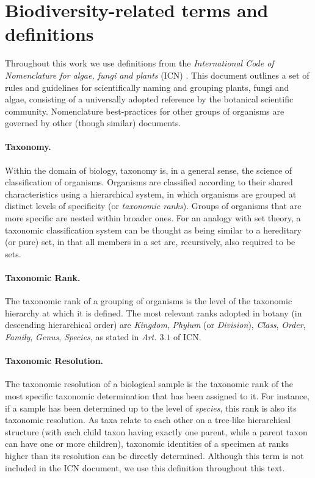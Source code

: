 \section{Biodiversity-related terms and definitions} \label{section:biodiversity_terms}

Throughout this work we use definitions from the \textit{International Code of Nomenclature for algae, fungi and plants} (ICN) \cite{McNeill2012}. This document outlines a set of rules and guidelines for scientifically naming and grouping plants, fungi and algae, consisting of a universally adopted reference by the botanical scientific community. Nomenclature best-practices for other groups of organisms are governed by other (though similar) documents.

\paragraph*{Taxonomy.}
Within the domain of biology, taxonomy is, in a general sense, the science of classification of organisms. 
Organisms are classified according to their shared characteristics using a hierarchical system, in which organisms are grouped at distinct levels of specificity (or \textit{taxonomic ranks}).
Groups of organisms that are more specific are nested within broader ones. 
For an analogy with set theory, a taxonomic classification system can be thought as being similar to a hereditary (or pure) set, in that all members in a set are, recursively, also required to be sets.

\paragraph*{Taxonomic Rank.}
The taxonomic rank of a grouping of organisms is the level of the taxonomic hierarchy at which it is defined. The most relevant ranks adopted in botany (in descending hierarchical order) are \textit{Kingdom}, \textit{Phylum} (or \textit{Division}), \textit{Class}, \textit{Order}, \textit{Family}, \textit{Genus}, \textit{Species}, as stated in \textit{Art. $3.1$} of ICN.

\paragraph*{Taxonomic Resolution.}
The taxonomic resolution of a biological sample is the taxonomic rank of the most specific taxonomic determination that has been assigned to it.
For instance, if a sample has been determined up to the level of \textit{species}, this rank is also its taxonomic resolution.
As taxa relate to each other on a tree-like hierarchical structure (with each child taxon having exactly one parent, while a parent taxon can have one or more children), taxonomic identities of a specimen at ranks higher than its resolution can be directly determined.
Although this term is not included in the ICN document, we use this definition throughout this text.

